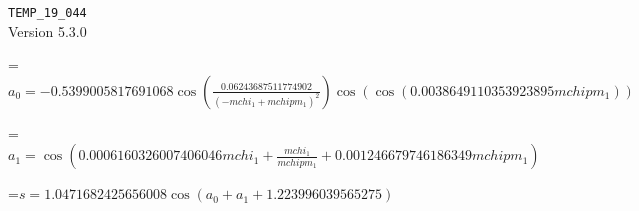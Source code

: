 \documentclass{article}
\newcommand{\exprline}[1]{\par\noindent\begingroup\setbox0=\hbox{$\displaystyle #1$}\ifdim\wd0>\linewidth\resizebox{\linewidth}{!}{\box0}\else\box0\fi\endgroup\par\medskip}
\begin{document}
\noindent\texttt{TEMP\_19\_044}\\
Version 5.3.0\\
\exprline{a_{0} = - 0.5399005817691068 \cos{\left(\frac{0.06243687511774902}{\left(- mchi_{1} + mchipm_{1}\right)^{2}} \right)} \cos{\left(\cos{\left(0.0038649110353923895 mchipm_{1} \right)} \right)}}
\exprline{a_{1} = \cos{\left(0.0006160326007406046 mchi_{1} + \frac{mchi_{1}}{mchipm_{1}} + 0.001246679746186349 mchipm_{1} \right)}}
\exprline{s = 1.0471682425656008 \cos{\left(a_{0} + a_{1} + 1.223996039565275 \right)}}
\end{document}
